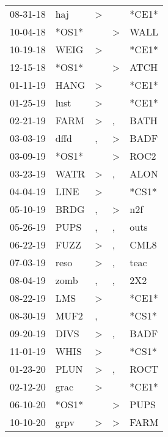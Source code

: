\begin{supertabular}{lllll}
 08-31-18 &    haj &     \textgreater &                  &  *CE1* \\
 10-04-18 &  *OS1* &                  &     \textgreater &   WALL \\
 10-19-18 &   WEIG &     \textgreater &                  &  *CE1* \\
 12-15-18 &  *OS1* &                  &     \textgreater &   ATCH \\
 01-11-19 &   HANG &     \textgreater &                  &  *CE1* \\
 01-25-19 &   lust &     \textgreater &                  &  *CE1* \\
 02-21-19 &   FARM &     \textgreater &                , &   BATH \\
 03-03-19 &   dffd &                , &     \textgreater &   BADF \\
 03-09-19 &  *OS1* &                  &     \textgreater &   ROC2 \\
 03-23-19 &   WATR &     \textgreater &                , &   ALON \\
 04-04-19 &   LINE &     \textgreater &                  &  *CS1* \\
 05-10-19 &   BRDG &                , &     \textgreater &    n2f \\
 05-26-19 &   PUPS &                , &                , &   outs \\
 06-22-19 &   FUZZ &     \textgreater &                , &   CML8 \\
 07-03-19 &   reso &     \textgreater &                , &   teac \\
 08-04-19 &   zomb &                , &                , &    2X2 \\
 08-22-19 &    LMS &     \textgreater &                  &  *CE1* \\
 08-30-19 &   MUF2 &                , &                  &  *CS1* \\
 09-20-19 &   DIVS &     \textgreater &                , &   BADF \\
 11-01-19 &   WHIS &     \textgreater &                  &  *CS1* \\
 01-23-20 &   PLUN &     \textgreater &                , &   ROCT \\
 02-12-20 &   grac &     \textgreater &                  &  *CE1* \\
 06-10-20 &  *OS1* &                  &     \textgreater &   PUPS \\
 10-10-20 &   grpv &     \textgreater &     \textgreater &   FARM \\
\end{supertabular}
